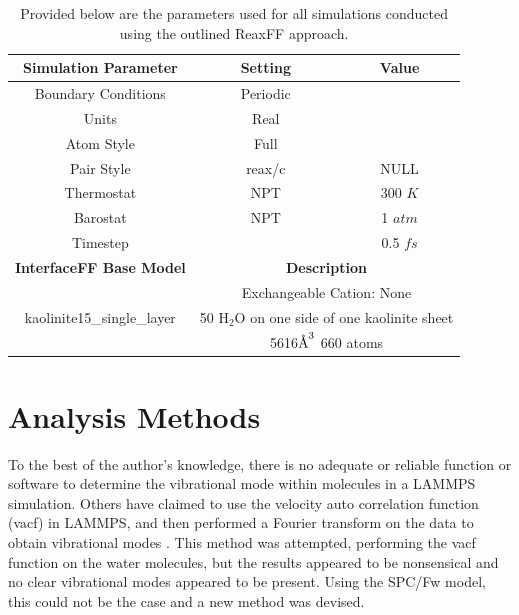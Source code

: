 			\begin{table}
				\centering
				\caption{Provided below are the parameters used for all simulations conducted using the outlined ReaxFF approach.}
				\label{tab:simulation_parameters_ReaxFF}
				\begin{tabular}{|c|c|c|}
					\hline
					\textbf{Simulation Parameter} & \textbf{Setting} & \textbf{Value}\\
					\hline
					Boundary Conditions & Periodic & \\
					\hline
					Units & Real & \\
					\hline
					Atom Style & Full & \\
					\hline
					Pair Style & reax/c & NULL \\
					\hline
					Thermostat & NPT & 300 $K$ \\
					\hline
					Barostat & NPT & 1 $atm$ \\
					\hline
					Timestep &  & 0.5 $fs$ \\
					\hline
					\hline
					\textbf{InterfaceFF Base Model} & \multicolumn{2}{c|}{\textbf{Description}} \\
					\hline
					\multirow{3}{*}{kaolinite15\_single\_layer} & \multicolumn{2}{c|}{Exchangeable Cation: None} \\ & \multicolumn{2}{c|}{50 H$_2$O on one side of one kaolinite sheet} \\ & \multicolumn{2}{c|}{5616$\text{\normalfont\AA}^3$ 660 atoms} \\
					\hline				
				\end{tabular}
			\end{table}
		
	\section{Analysis Methods}
		To the best of the author's knowledge, there is no adequate or reliable function or software to determine the vibrational mode within molecules in a LAMMPS simulation. Others have claimed to use the velocity auto correlation function (vacf) in LAMMPS, and then performed a Fourier transform on the data to obtain vibrational modes \cite{heinz2005force}. This method was attempted, performing the vacf function on the water molecules, but the results appeared to be nonsensical and no clear vibrational modes appeared to be present. Using the SPC/Fw model, this could not be the case and a new method was devised.
		

